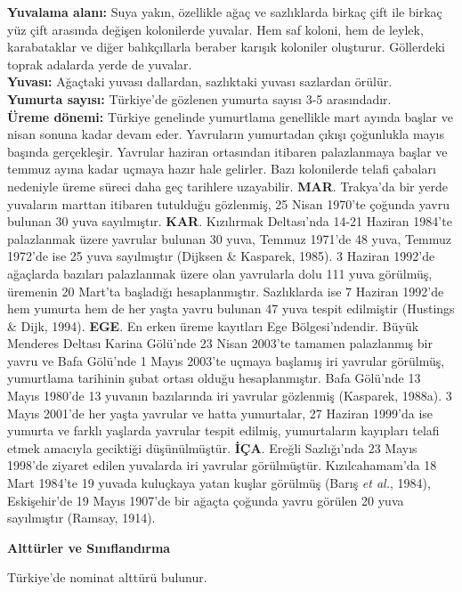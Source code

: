 \documentclass[
  a4paper,
  DIV=11,
  numbers=noendperiod]{scrreprt}
\begin{document}
\textbf{Yuvalama alanı:} Suya yakın, özellikle ağaç ve sazlıklarda
birkaç çift ile birkaç yüz çift arasında değişen kolonilerde yuvalar.
Hem saf koloni, hem de leylek, karabataklar ve diğer balıkçıllarla
beraber karışık koloniler oluşturur. Göllerdeki toprak adalarda yerde de
yuvalar.\\
\textbf{Yuvası:} Ağaçtaki yuvası dallardan, sazlıktaki yuvası sazlardan
örülür.\\
\textbf{Yumurta sayısı:} Türkiye'de gözlenen yumurta sayısı 3-5
arasındadır.\\
\textbf{Üreme dönemi:} Türkiye genelinde yumurtlama genellikle mart
ayında başlar ve nisan sonuna kadar devam eder. Yavruların yumurtadan
çıkışı çoğunlukla mayıs başında gerçekleşir. Yavrular haziran ortasından
itibaren palazlanmaya başlar ve temmuz ayına kadar uçmaya hazır hale
gelirler. Bazı kolonilerde telafi çabaları nedeniyle üreme süreci daha
geç tarihlere uzayabilir. \textbf{MAR}. Trakya'da bir yerde yuvaların
marttan itibaren tutulduğu gözlenmiş, 25 Nisan 1970'te çoğunda yavru
bulunan 30 yuva sayılmıştır. \textbf{KAR}. Kızılırmak Deltası'nda 14-21
Haziran 1984'te palazlanmak üzere yavrular bulunan 30 yuva, Temmuz
1971'de 48 yuva, Temmuz 1972'de ise 25 yuva sayılmıştır (Dijksen \&
Kasparek, 1985). 3 Haziran 1992'de ağaçlarda bazıları palazlanmak üzere
olan yavrularla dolu 111 yuva görülmüş, üremenin 20 Mart'ta başladığı
hesaplanmıştır. Sazlıklarda ise 7 Haziran 1992'de hem yumurta hem de her
yaşta yavru bulunan 47 yuva tespit edilmiştir (Hustings \& Dijk, 1994).
\textbf{EGE}. En erken üreme kayıtları Ege Bölgesi'ndendir. Büyük
Menderes Deltası Karina Gölü'nde 23 Nisan 2003'te tamamen palazlanmış
bir yavru ve Bafa Gölü'nde 1 Mayıs 2003'te uçmaya başlamış iri yavrular
görülmüş, yumurtlama tarihinin şubat ortası olduğu hesaplanmıştır. Bafa
Gölü'nde 13 Mayıs 1980'de 13 yuvanın bazılarında iri yavrular gözlenmiş
(Kasparek, 1988a). 3 Mayıs 2001'de her yaşta yavrular ve hatta
yumurtalar, 27 Haziran 1999'da ise yumurta ve farklı yaşlarda yavrular
tespit edilmiş, yumurtaların kayıpları telafi etmek amacıyla geciktiği
düşünülmüştür. \textbf{İÇA}. Ereğli Sazlığı'nda 23 Mayıs 1998'de ziyaret
edilen yuvalarda iri yavrular görülmüştür. Kızılcahamam'da 18 Mart
1984'te 19 yuvada kuluçkaya yatan kuşlar görülmüş (Barış \emph{et al.},
1984), Eskişehir'de 19 Mayıs 1907'de bir ağaçta çoğunda yavru görülen 20
yuva sayılmıştır (Ramsay, 1914).

\textbf{Alttürler ve Sınıflandırma}

Türkiye'de nominat alttürü bulunur.
\end{document}
